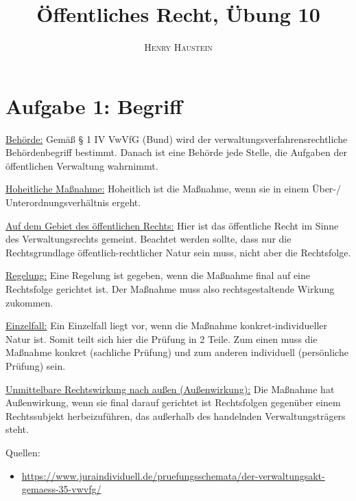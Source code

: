 \documentclass{article}
\title{\textbf{Öffentliches Recht, Übung 10}}
\author{\textsc{Henry Haustein}}
\date{}
\begin{document}
	\maketitle
	
	\section*{Aufgabe 1: Begriff}
	\underline{Behörde:} Gemäß § 1 IV VwVfG (Bund) wird der verwaltungsverfahrensrechtliche Behördenbegriff bestimmt. Danach ist eine Behörde jede Stelle, die Aufgaben der öffentlichen Verwaltung wahrnimmt.
	
	\underline{Hoheitliche Maßnahme:} Hoheitlich ist die Maßnahme, wenn sie in einem Über-/ Unterordnungsverhältnis ergeht.
	
	\underline{Auf dem Gebiet des öffentlichen Rechts:} Hier ist das öffentliche Recht im Sinne des Verwaltungsrechts gemeint. Beachtet werden sollte, dass nur die Rechtsgrundlage öffentlich-rechtlicher Natur sein muss, nicht aber die Rechtsfolge.
	
	\underline{Regelung:} Eine Regelung ist gegeben, wenn die Maßnahme final auf eine Rechtsfolge gerichtet ist. Der Maßnahme muss also rechtsgestaltende Wirkung zukommen.
	
	\underline{Einzelfall:} Ein Einzelfall liegt vor, wenn die Maßnahme konkret-individueller Natur ist. Somit teilt sich hier die Prüfung in 2 Teile. Zum einen muss die Maßnahme konkret (sachliche Prüfung) und zum anderen individuell (persönliche Prüfung) sein.
	
	\underline{Unmittelbare Rechtswirkung nach außen (Außenwirkung):} Die Maßnahme hat Außenwirkung, wenn sie final darauf gerichtet ist Rechtsfolgen gegenüber einem Rechtssubjekt herbeizuführen, das außerhalb des handelnden Verwaltungsträgers steht.
	
	Quellen:
	\begin{itemize}
		\item \url{https://www.juraindividuell.de/pruefungsschemata/der-verwaltungsakt-gemaess-35-vwvfg/}
	\end{itemize}
\end{document}
